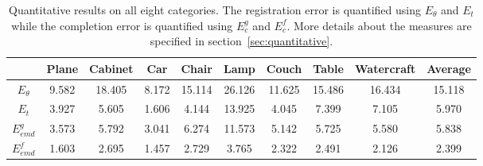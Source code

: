 \begin{table*}[!t]
	\caption{Quantitative results on all eight categories. The registration error is quantified using $E_{\theta}$ and $E_{t}$  while the completion error is quantified using $E_{c}^g$ and $E_{c}^f$. More details about the measures are specified in section~\ref{sec:quantitative}.}
	\label{tab:result}
	\renewcommand\arraystretch{1.2}
	\begin{center}
	\begin{tabular}{c||c|c|c|c|c|c|c|c||c}
		\hline
		              & Plane  & Cabinet & Car   & Chair  & Lamp   & Couch  & Table  & Watercraft & Average\\ \hline
		 $E_{\theta}$ & 9.582  & 18.405  & 8.172 & 15.114 & 26.126 & 11.625 & 15.486 & 16.434 & 15.118 \\ \hline
		 $E_{t}$      & 3.927  & 5.605   & 1.606 & 4.144  & 13.925 & 4.045  & 7.399  & 7.105  & 5.970 \\ \hline
		 $E_{emd}^g$  & 3.573  & 5.792   & 3.041 & 6.274  & 11.573 & 5.142  & 5.725  & 5.580  & 5.838 \\ \hline
		 $E_{emd}^f$  & 1.603  & 2.695   & 1.457 & 2.729  & 3.765  & 2.322  & 2.491  & 2.126  & 2.399 \\ \hline
	\end{tabular}
	\end{center}
\end{table*}
